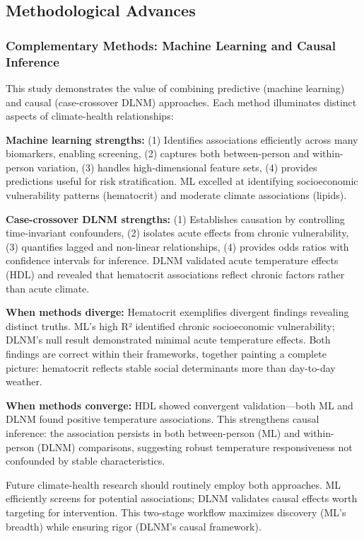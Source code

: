 \subsection{Methodological Advances}

\subsubsection{Complementary Methods: Machine Learning and Causal Inference}

This study demonstrates the value of combining predictive (machine learning) and causal (case-crossover DLNM) approaches. Each method illuminates distinct aspects of climate-health relationships:

\textbf{Machine learning strengths:} (1) Identifies associations efficiently across many biomarkers, enabling screening, (2) captures both between-person and within-person variation, (3) handles high-dimensional feature sets, (4) provides predictions useful for risk stratification. ML excelled at identifying socioeconomic vulnerability patterns (hematocrit) and moderate climate associations (lipids).

\textbf{Case-crossover DLNM strengths:} (1) Establishes causation by controlling time-invariant confounders, (2) isolates acute effects from chronic vulnerability, (3) quantifies lagged and non-linear relationships, (4) provides odds ratios with confidence intervals for inference. DLNM validated acute temperature effects (HDL) and revealed that hematocrit associations reflect chronic factors rather than acute climate.

\textbf{When methods diverge:} Hematocrit exemplifies divergent findings revealing distinct truths. ML's high R² identified chronic socioeconomic vulnerability; DLNM's null result demonstrated minimal acute temperature effects. Both findings are correct within their frameworks, together painting a complete picture: hematocrit reflects stable social determinants more than day-to-day weather.

\textbf{When methods converge:} HDL showed convergent validation---both ML and DLNM found positive temperature associations. This strengthens causal inference: the association persists in both between-person (ML) and within-person (DLNM) comparisons, suggesting robust temperature responsiveness not confounded by stable characteristics.

Future climate-health research should routinely employ both approaches. ML efficiently screens for potential associations; DLNM validates causal effects worth targeting for intervention. This two-stage workflow maximizes discovery (ML's breadth) while ensuring rigor (DLNM's causal framework).

